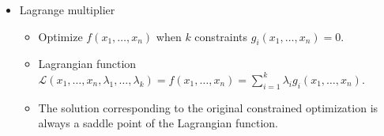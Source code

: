 \begin{itemize}
    \item Lagrange multiplier
    
    \begin{itemize}
        \itemsep-0.5em
      \item Optimize $f(x_1, \ldots, x_n)$ when $k$ constraints $g_i(x_1, \ldots, x_n)=0$.
      \item Lagrangian function $\mathcal{L}(x_1, \ldots, x_n, \lambda_1, \ldots, \lambda_k) = f(x_1, \ldots, x_n) = \sum^{k}_{i=1}\lambda_i g_i(x_1, \ldots, x_n)$.
      \item The solution corresponding to the original constrained optimization is always a saddle point of the Lagrangian function.
    \end{itemize}
    
    
    \end{itemize}
